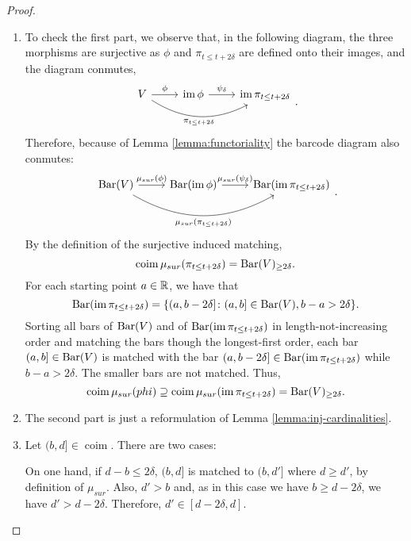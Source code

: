 \begin{proof}
\begin{enumerate}
    \item
    To check the first part, we observe that, in the following diagram, the three morphisms are surjective as $\phi$ and $\pi_{t \leq t+2\delta}$ are defined onto their images, and the diagram conmutes,
    $$
    \begin{tikzcd}
        V \arrow[r, "\phi"] \arrow[rr, "\pi_{t \leq t+2\delta}"', bend right] 
        & \im \phi \arrow[r, "\psi_\delta"] 
        & \im \pi_{t \leq t+2\delta} \\
    \end{tikzcd}.
    $$
    Therefore, because of Lemma \ref{lemma:functoriality} the barcode diagram also conmutes:
    $$
    \begin{tikzcd}
        \barc(V) \arrow[r, "\mu_{sur}(\phi)"] \arrow[rr, "\mu_{sur}(\pi_{t \leq t+2\delta})"', bend right] 
        & \barc(\im \phi) \arrow[r, "\mu_{sur}({\psi_\delta})"] 
        & \barc(\im \pi_{t \leq t+2\delta}) \\
    \end{tikzcd}.
    $$
    By the definition of the surjective induced matching,
    $$
        \operatorname{coim} \mu_{sur}(\pi_{t \leq t+2\delta}) = \operatorname{Bar}(V)_{\geq 2\delta}.
    $$
    For each starting point $ a \in \mathbb R $, we have that
    $$
        \operatorname{Bar}(\operatorname{im} \pi_{t \leq t+2\delta}) = \{ (a, b-2\delta] \colon (a, b]\in \operatorname{Bar}(V), b-a > 2\delta\}.
    $$
    Sorting all bars of $\operatorname{Bar}(V) $ and of $\operatorname{Bar}(\operatorname{im} \pi_{t \leq t+2\delta}) $ in length-not-increasing order and matching the bars though the longest-first order, each bar $ (a, b] \in \operatorname{Bar}(V) $ is matched with the bar $ (a, b - 2\delta] \in \operatorname{Bar}(\operatorname{im} \pi_{t \leq t+2\delta}) $ while $ b -a >2 \delta $. The smaller bars are not matched. Thus,
    $$
        \operatorname{coim} \mu_{sur}(phi) \supseteq \operatorname{coim} \mu_{sur}(\operatorname{im} \pi_{t \leq t+2\delta}) = \operatorname{Bar} (V)_{\geq 2\delta}.
    $$

    \item
    The second part is just a reformulation of Lemma \ref{lemma:inj-cardinalities}.

    \item
    Let $ (b,d] \in \operatorname{coim} $. There are two cases:

    On one hand, if $ d - b \leq 2 \delta $, $(b, d]$ is matched to $ (b, d'] $ where $ d \geq d'$, by definition of $ \mu_{sur} $. Also, $ d' > b $ and, as in this case we have $ b \geq d - 2 \delta $, we have $ d' > d - 2 \delta $. Therefore, $ d' \in [d - 2 \delta, d]$.


\end{enumerate}
\end{proof}
